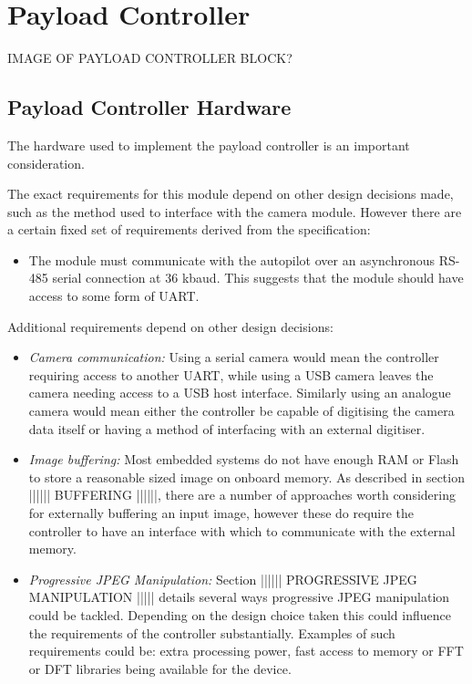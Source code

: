 \section{Payload Controller}
IMAGE OF PAYLOAD CONTROLLER BLOCK?

\subsection{Payload Controller Hardware}
The hardware used to implement the payload controller is an important consideration.

The exact requirements for this module depend on other design decisions made, such as the method used to interface with the camera module. However there are a certain fixed set of requirements derived from the specification:

\begin{itemize}
\item The module must communicate with the autopilot over an asynchronous RS-485 serial connection at 36 kbaud. This suggests that the module should have access to some form of UART.
\end{itemize}

Additional requirements depend on other design decisions:

\begin{itemize}
\item \emph{Camera communication:} Using a serial camera would mean the controller requiring access to another UART, while using a USB camera leaves the camera needing access to a USB host interface. Similarly using an analogue camera would mean either the controller be capable of digitising the camera data itself or having a method of interfacing with an external digitiser.
 
\item \emph{Image buffering:} Most embedded systems do not have enough RAM or Flash to store a reasonable sized image on onboard memory. As described in section |||||| BUFFERING ||||||, there are a number of approaches worth considering for externally buffering an input image, however these do require the controller to have an interface with which to communicate with the external memory. 

\item \emph{Progressive JPEG Manipulation:} Section |||||| PROGRESSIVE JPEG MANIPULATION ||||| details several ways progressive JPEG manipulation could be tackled. Depending on the design choice taken this could influence the requirements of the controller substantially. Examples of such requirements could be: extra processing power, fast access to memory or FFT or DFT libraries being available for the device.
\end{itemize}

